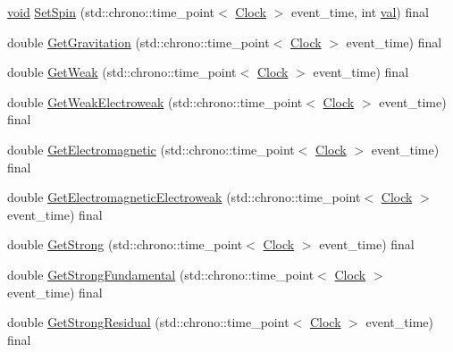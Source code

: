 \begin{DoxyCompactItemize}
\item 
\mbox{\hyperlink{glad_8h_a950fc91edb4504f62f1c577bf4727c29}{void}} \mbox{\hyperlink{class_law_a3de75edea5e20db0a7b731de61f07dea}{Set\+Spin}} (std\+::chrono\+::time\+\_\+point$<$ \mbox{\hyperlink{universe_8h_a0ef8d951d1ca5ab3cfaf7ab4c7a6fd80}{Clock}} $>$ event\+\_\+time, int \mbox{\hyperlink{glad_8h_a26942fd2ed566ef553eae82d2c109c8f}{val}}) final
\item 
double \mbox{\hyperlink{class_law_a84bdc0c2ca97a9c19422018ff761b992}{Get\+Gravitation}} (std\+::chrono\+::time\+\_\+point$<$ \mbox{\hyperlink{universe_8h_a0ef8d951d1ca5ab3cfaf7ab4c7a6fd80}{Clock}} $>$ event\+\_\+time) final
\item 
double \mbox{\hyperlink{class_law_a303c365b7a17997a63a74756fc72fba3}{Get\+Weak}} (std\+::chrono\+::time\+\_\+point$<$ \mbox{\hyperlink{universe_8h_a0ef8d951d1ca5ab3cfaf7ab4c7a6fd80}{Clock}} $>$ event\+\_\+time) final
\item 
double \mbox{\hyperlink{class_law_aad6e54da64a5d8499dcb6c232aa6748f}{Get\+Weak\+Electroweak}} (std\+::chrono\+::time\+\_\+point$<$ \mbox{\hyperlink{universe_8h_a0ef8d951d1ca5ab3cfaf7ab4c7a6fd80}{Clock}} $>$ event\+\_\+time) final
\item 
double \mbox{\hyperlink{class_law_a01eba6e68d2d8a717e2b4789be90853d}{Get\+Electromagnetic}} (std\+::chrono\+::time\+\_\+point$<$ \mbox{\hyperlink{universe_8h_a0ef8d951d1ca5ab3cfaf7ab4c7a6fd80}{Clock}} $>$ event\+\_\+time) final
\item 
double \mbox{\hyperlink{class_law_ae4ccaca7b78905f416f35f9556b1923c}{Get\+Electromagnetic\+Electroweak}} (std\+::chrono\+::time\+\_\+point$<$ \mbox{\hyperlink{universe_8h_a0ef8d951d1ca5ab3cfaf7ab4c7a6fd80}{Clock}} $>$ event\+\_\+time) final
\item 
double \mbox{\hyperlink{class_law_afd94bf09dbaf5d5df36b8f093db02dd9}{Get\+Strong}} (std\+::chrono\+::time\+\_\+point$<$ \mbox{\hyperlink{universe_8h_a0ef8d951d1ca5ab3cfaf7ab4c7a6fd80}{Clock}} $>$ event\+\_\+time) final
\item 
double \mbox{\hyperlink{class_law_afcdbea76524e5a52691fff7b526971e9}{Get\+Strong\+Fundamental}} (std\+::chrono\+::time\+\_\+point$<$ \mbox{\hyperlink{universe_8h_a0ef8d951d1ca5ab3cfaf7ab4c7a6fd80}{Clock}} $>$ event\+\_\+time) final
\item 
double \mbox{\hyperlink{class_law_a70fb2a7710776c4e2315a1e29fe35eb6}{Get\+Strong\+Residual}} (std\+::chrono\+::time\+\_\+point$<$ \mbox{\hyperlink{universe_8h_a0ef8d951d1ca5ab3cfaf7ab4c7a6fd80}{Clock}} $>$ event\+\_\+time) final
\item 

\end{DoxyCompactItemize}
